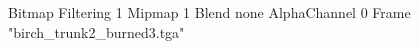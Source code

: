 {Bitmap
	{Filtering 1}
	{Mipmap 1}
	{Blend none}
	{AlphaChannel 0}
	{Frame "birch_trunk2_burned3.tga"}
}
